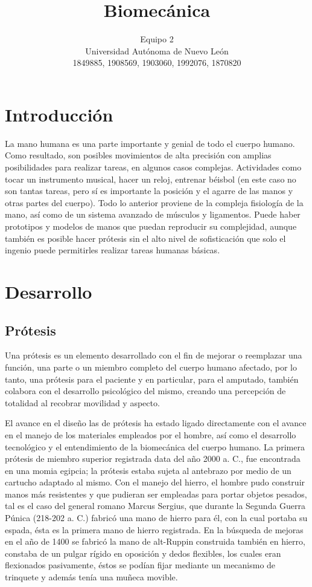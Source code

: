 \documentclass[a4paper]{article}
\title{Biomecánica}
\author{Equipo 2\\
  \small Universidad Autónoma de Nuevo León\\
  \small 1849885, 1908569, 1903060, 1992076, 1870820
  \date{}
}
\begin{document}
\maketitle

\section{Introducci\'on}
La mano humana es una parte importante y genial de todo el cuerpo humano. Como resultado, son posibles movimientos de alta precisión con amplias posibilidades para realizar tareas, en algunos casos complejas. Actividades como tocar un instrumento musical, hacer un reloj, entrenar béisbol (en este caso no son tantas tareas, pero sí es importante la posición y el agarre de las manos y otras partes del cuerpo). Todo lo anterior proviene de la compleja fisiología de la mano, así como de un sistema avanzado de músculos y ligamentos. Puede haber prototipos y modelos de manos que puedan reproducir su complejidad, aunque también es posible hacer prótesis sin el alto nivel de sofisticación que solo el ingenio puede permitirles realizar tareas humanas básicas. 


\section{Desarrollo}
\subsection{Prótesis}
Una prótesis es un elemento desarrollado con el fin de mejorar o reemplazar una función, una parte o un miembro completo del cuerpo humano afectado, por lo tanto, una prótesis para el paciente y en particular, para el amputado, también colabora con el desarrollo psicológico del mismo, creando una percepción de totalidad al recobrar movilidad y aspecto. 

El avance en el diseño las de prótesis ha estado ligado directamente con el avance en el manejo de los materiales empleados por el hombre, así como el desarrollo tecnológico y el entendimiento de la biomecánica del cuerpo humano. La primera prótesis de miembro superior registrada data del año 2000 a. C., fue encontrada en una momia egipcia; la prótesis estaba sujeta al antebrazo por medio de un cartucho adaptado al mismo. Con el manejo del hierro, el hombre pudo construir manos más resistentes y que pudieran ser empleadas para portar objetos pesados, tal es el caso del general romano Marcus Sergius, que durante la Segunda Guerra Púnica (218-202 a. C.) fabricó una mano de hierro para él, con la cual portaba su espada, ésta es la primera mano de hierro registrada. En la búsqueda de mejoras en el año de 1400 se fabricó la mano de alt-Ruppin construida también en hierro, constaba de un pulgar rígido en oposición y dedos flexibles, los cuales eran flexionados pasivamente, éstos se podían fijar mediante un mecanismo de trinquete y además tenía una muñeca movible. 
\end{document}
